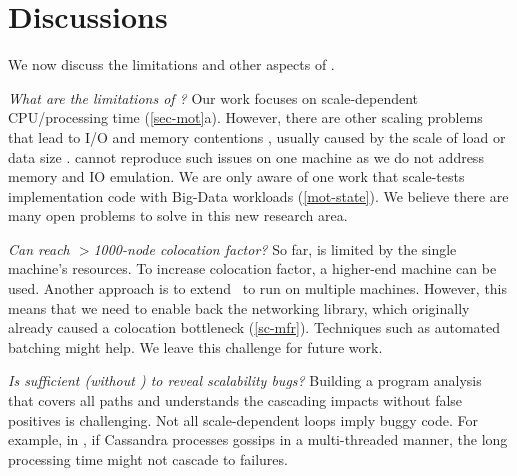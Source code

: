 

\section{Discussions}
\label{sec-discuss}

We now discuss the limitations and other aspects of \sck.


{\em What are the limitations of \sck?}
%
Our work focuses on scale-dependent CPU/processing time
(\sec\ref{sec-mot}a).
%
However, there are other scaling problems that lead to I/O and memory
contentions \cite{ Gunawi+14-Cbs, Ousterhout+15-MakingSense,
  Konstantin+10-HDFSScalability}, usually caused by the scale of load
\cite{Bodik+10-WorkloadSpikes, Guo+13-CureIsWorse} or data size
\cite{Nguyen+16-Yak}.
\sck cannot reproduce such issues on one machine as we do not address
memory and IO emulation.
%
We are only aware of one work \cite{Wang+14-Exalt} that scale-tests
implementation code with Big-Data workloads (\sec\ref{mot-state}).
%
We believe there are many open problems to solve in this new research
area.


{\em Can \sck reach $>$1000-node colocation factor?}  So far, \sck is
limited by the single machine's resources.  To increase colocation factor,
a higher-end machine can be used.   Another approach is to 
extend \sck\ to run on multiple machines.
However, this means that we need to enable back the networking library,
which originally already caused a colocation 
bottleneck (\sec\ref{sc-mfr}).  Techniques such as automated
batching might help.  We leave this challenge for future work.



{\em Is \sfind sufficient (without \stest) to reveal scalability bugs?}
Building a program analysis that covers all paths and understands the
cascading impacts without false positives is challenging.  Not all
scale-dependent loops imply buggy code.  For example, in \caone, if
Cassandra processes gossips in a multi-threaded manner, the long
processing time might not cascade to failures.


